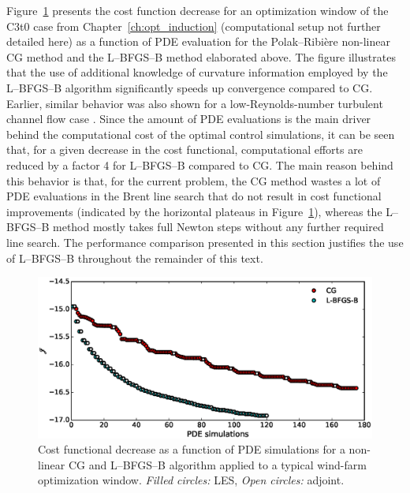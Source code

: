 	Figure~\ref{fig:cg_bfgs} presents the cost function decrease for an optimization window of the C3t0 case from Chapter~\ref{ch:opt_induction} (computational setup not further detailed here) as a function of PDE evaluation for the Polak--Ribi\`ere non-linear CG method and the L--BFGS--B method elaborated above. The figure illustrates that the use of additional knowledge of curvature information employed by the L--BFGS--B algorithm significantly speeds up convergence compared to CG. Earlier, similar behavior was also shown for a low-Reynolds-number turbulent channel flow case \citep{nita2016efficiency}. Since the amount of PDE evaluations is the main driver behind the computational cost of the optimal control simulations, it can be seen that, for a given decrease in the cost functional, computational efforts are reduced by a factor 4 for L--BFGS--B compared to CG. The main reason behind this behavior is that, for the current problem, the CG method wastes a lot of PDE evaluations in the Brent line search that do not result in cost functional improvements (indicated by the horizontal plateaus in Figure~\ref{fig:cg_bfgs}), whereas the L--BFGS--B method mostly takes full Newton steps without any further required line search. The performance comparison presented in this section justifies the use of L--BFGS--B throughout the remainder of this text. 
	
	\begin{figure}
		\centering
		\includegraphics[width=\linewidth]{chapters/optimal_control_problem/figure5.eps}
		\caption[Cost functional decrease as a function of PDE simulations for a non-linear CG and L--BFGS--B algorithm applied to a typical wind-farm optimization window.]{Cost functional decrease as a function of PDE simulations for a non-linear CG and L--BFGS--B algorithm applied to a typical wind-farm optimization window. \emph{Filled circles: } LES, \emph{Open circles: } adjoint. }
		\label{fig:cg_bfgs}
	\end{figure}
	
